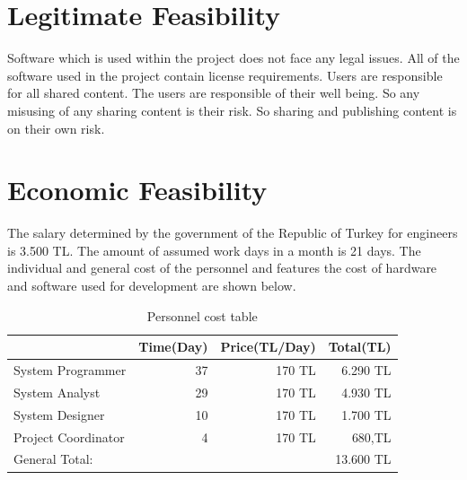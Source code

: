 \newpage
\section{Legitimate Feasibility}
Software which is used within the project does not face any legal issues. All of the
software used in the project contain license requirements. Users are responsible for
all shared content. The users are responsible of their well being. So any misusing of 
any sharing content is their risk. So sharing and publishing content is on their own risk.


\section{Economic Feasibility}
The salary determined by the government of the Republic of Turkey for engineers
is 3.500 TL\cite{muhendisMaas}. The amount of assumed work days in a month is 21 days. The
individual and general cost of the personnel and features
the cost of hardware and software used for development are shown below.

\begin{table}[!h!]
\centering
\caption{Personnel cost table}
\label{tab:maas}
\begin{tabular}{|l|r|r|r|}
\hline
& \multicolumn{1}{l|}{\textbf{Time(Day)}} & \multicolumn{1}{l|}{\textbf{Price(TL/Day)}} & \multicolumn{1}{l|}{\textbf{Total(TL)}} \\ \hline
System Programmer   & 37                                      & 170 TL                                      & 6.290 TL                                 \\ \hline
System Analyst      & 29                                      & 170 TL                                      & 4.930 TL                                 \\ \hline
System Designer     & 10                                      & 170 TL                                      & 1.700 TL                                 \\ \hline
Project Coordinator & 4                                       & 170 TL                                      & 680,TL                                  \\ \hline
General Total:      & \multicolumn{3}{r|}{13.600 TL}                                                                                                  \\ \hline
\end{tabular}
\end{table}

